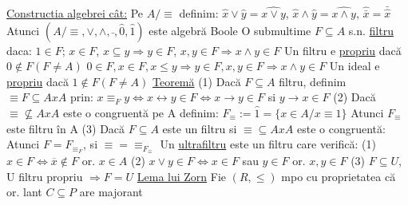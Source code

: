 \documentclass[twocolumn]{article}
\begin{document}
	\noindent\underline{Constructia algebrei cât:} \newline
	Pe $A/\equiv$ definim: \newline
	$\hat{x} \vee \hat{y} = \widehat{x \vee y}$, $\hat{x} \wedge \hat{y} = \widehat{x \wedge y}$, $\hat{\bar{x}} = \bar{\hat{x}}$ \newline
	Atunci $(A/\equiv, \vee, \wedge, \bar{ }, \hat{0}, \hat{1})$ este algebră Boole \newline
	O submultime $F \subseteq A$ s.n. \underline {filtru} daca: \newline
	$1 \in F$; $x \in F$, $x \subseteq y \Rightarrow y \in F$, $x, y \in F \Rightarrow x \wedge y \in F$ \newline
	Un filtru e \underline{propriu} dacă $0 \notin F (F \neq A)$ \newline
	$0 \in F, x \in F, x \leq y \Rightarrow y \in F, x, y \in F \Rightarrow x \wedge y \in F$ \newline
	Un ideal e \underline{propriu} dacă $1 \notin F(F \neq A)$ \newline
	\underline{Teoremă} \newline
	(1) Dacă $F \subseteq A$ filtru, definim $\equiv F \subseteq A x A$ prin: \newline
	$x \equiv _{F} y \Leftrightarrow x \leftrightarrow y \in F \Leftrightarrow x \rightarrow y \in F$ si $y \rightarrow x \in F$ \newline
	(2) Dacă $\equiv \not\subseteq A x A$ este o congruentă pe A definim: \newline
	$F_{\equiv} := \hat{1} = \{x \in A / x \equiv 1\}$ \newline
	Atunci $F_{\equiv}$ este filtru în A \newline
	(3) Dacă $F \subseteq A$ este un filtru si $\equiv \subseteq A x A$ este o congruentă: \newline
	Atunci $F = F_{\equiv _{F}}$, si $\equiv = \equiv _{F_{\equiv}}$ \newline
	Un \underline{ultrafiltru} este un filtru care verifică: \newline
	(1) $x \in F \Leftrightarrow \overline{x} \notin F$ or. $x \in A$ \newline
	(2) $x \vee y \in F \Leftrightarrow x \in F$ sau $y \in F$ or. $x, y \in F$ \newline
	(3) $F \subseteq U$, U filtru propriu $\Rightarrow F = U$ \newline
	\underline{Lema lui Zorn} \newline
	Fie $(R, \leq)$ mpo cu proprietatea că or. lant $C \subseteq P$ are majorant \newline
\end{document}

